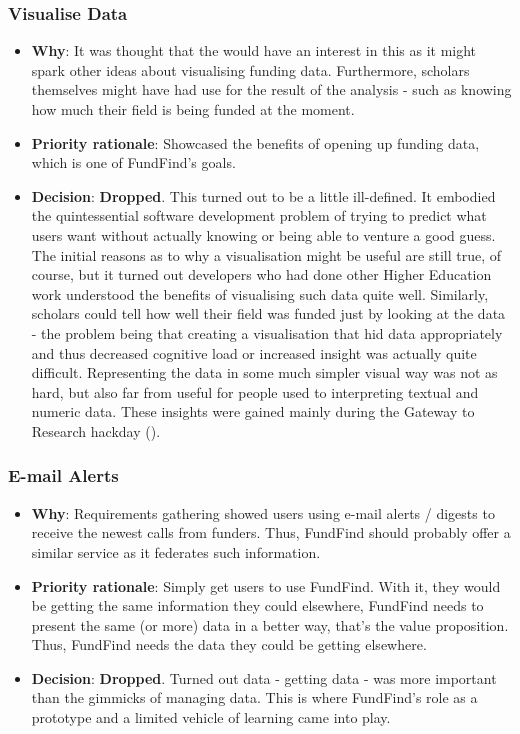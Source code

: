 \subsubsection{Visualise Data}
\begin{itemize}
 \item \textbf{Why}: It was thought that the  would have an interest in this as it might spark other ideas about visualising funding data. Furthermore, scholars themselves might have had use for the result of the analysis - such as knowing how much their field is being funded at the moment.
 \item \textbf{Priority rationale}: Showcased the benefits of opening up funding data, which is one of FundFind's goals.
 \item \textbf{Decision}: \textbf{Dropped}. This turned out to be a little ill-defined. It embodied the quintessential software development problem of trying to predict what users want without actually knowing or being able to venture a good guess. The initial reasons as to why a visualisation might be useful are still true, of course, but it turned out developers who had done other Higher Education work understood the benefits of visualising such data quite well. Similarly, scholars could tell how well their field was funded just by looking at the data - the problem being that creating a visualisation that hid data appropriately and thus decreased cognitive load or increased insight was actually quite difficult. Representing the data in some much simpler visual way was not as hard, but also far from useful for people used to interpreting textual and numeric data. These insights were gained mainly during the Gateway to Research hackday ().
\end{itemize}

\subsubsection{E-mail Alerts}
\begin{itemize}
 \item \textbf{Why}: Requirements gathering showed users using e-mail alerts / digests to receive the newest calls from funders. Thus, FundFind should probably offer a similar service as it federates such information.
 \item \textbf{Priority rationale}: Simply get users to use FundFind. With it, they would be getting the same information they could elsewhere, FundFind needs to present the same (or more) data in a better way, that's the value proposition. Thus, FundFind needs the data they could be getting elsewhere.
 \item \textbf{Decision}: \textbf{Dropped}. Turned out data - getting data - was more important than the gimmicks of managing data. This is where FundFind's role as a prototype and a limited vehicle of learning came into play.
\end{itemize}


